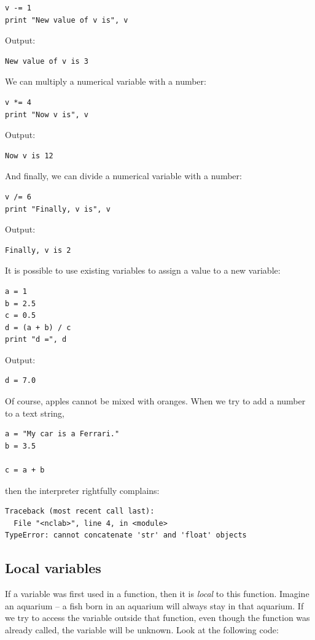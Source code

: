 \documentclass[article,A4,12pt]{llncs}
\begin{document}
\begin{verbatim}
v -= 1
print "New value of v is", v
\end{verbatim}
Output:

\begin{verbatim}
New value of v is 3
\end{verbatim}
We can multiply a numerical variable with a number:

\begin{verbatim}
v *= 4
print "Now v is", v
\end{verbatim}
Output:

\begin{verbatim}
Now v is 12
\end{verbatim}
And finally, we can divide a numerical variable with a number:

\begin{verbatim}
v /= 6
print "Finally, v is", v
\end{verbatim}
Output:

\begin{verbatim}
Finally, v is 2
\end{verbatim}
It is possible to use existing variables to assign a value to a new variable:

\begin{verbatim}
a = 1
b = 2.5
c = 0.5
d = (a + b) / c
print "d =", d
\end{verbatim}
Output:

\begin{verbatim}
d = 7.0
\end{verbatim}
Of course, apples cannot be mixed with oranges. When we try to 
add a number to a text string,

\begin{verbatim}
a = "My car is a Ferrari."
b = 3.5

c = a + b
\end{verbatim}
then the interpreter rightfully complains:

\begin{verbatim}
Traceback (most recent call last):
  File "<nclab>", line 4, in <module>
TypeError: cannot concatenate 'str' and 'float' objects
\end{verbatim}


\subsection{Local variables}

If a variable was first used in a function, then it is {\em local} to this 
function. Imagine an aquarium -- a fish born in an aquarium will always 
stay in that aquarium. If we try to access the variable outside that function,
even though the function was already called, the variable will be unknown. Look
at the following code:
\end{document}
